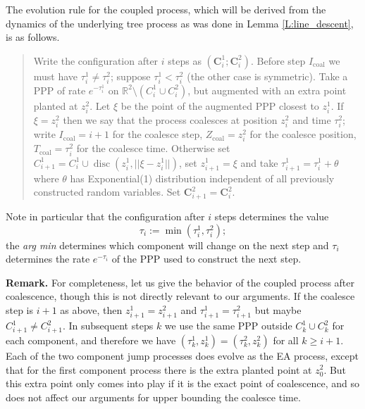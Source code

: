 \documentclass[12pt]{article}
\newcommand{\Reals}{{\mathbb{R}}}
\newcommand{\bC}{{\mathbf C}}
\newcommand{\Tcouple}{T_{\mathrm{coal}}}
\newcommand{\Icouple}{I_{\mathrm{coal}}}
\newcommand{\Zcouple}{Z_{\mathrm{coal}}}
\DeclareMathOperator{\disc}{disc}
\begin{document}
 
The evolution rule for the coupled process, which will be derived from
the dynamics of the underlying tree process as was done in Lemma \ref{L:line_descent},
is as follows.

\begin{quote}
 Write the configuration after $i$ steps as $(\bC^1_i; \bC^2_i)$. 
Before step $\Icouple$ we must have $\tau_i^1 \ne \tau^2_i$; 
 suppose $\tau_i^1 < \tau^2_i$ (the other case is symmetric).
Take a PPP of rate $e^{-\tau^1_i}$ on 
$\Reals^2 \setminus (C^1_i \cup C^2_i)$, but augmented with an extra point planted
at $z^2_i$.  
Let $\xi$ be the point of the augmented PPP closest to $z^1_i$.  
If $\xi = z^2_i$ then we say that the process coalesces at
position $z^2_i$ and time $\tau^2_i$; 
write $\Icouple = i+1$ for the coalesce step, 
$\Zcouple = z^2_i$ for the coalesce position,
$\Tcouple = \tau^2_i$ for the coalesce time.
Otherwise set $C^1_{i+1} = C^1_i \cup \disc(z^1_i, ||\xi - z^1_i||)$, 
set $z^1_{i+1} = \xi$ and take 
$\tau^1_{i+1} = \tau^1_i + \theta$
 where $\theta$ has Exponential(1) 
distribution independent of all previously constructed random variables.  
Set $ \bC^2_{i+1} =  \bC^2_i$.
\end{quote}

\noindent
Note in particular that the  configuration after $i$ steps determines the value
\begin{equation}
\tau_i := \min(\tau^1_i, \tau^2_i);
\end{equation}
 the {\em arg min} determines which component will change on the next step
and $\tau_i$ determines the rate $e^{- \tau_i}$  of the PPP used to construct the next step.


{\bf Remark.} 
For completeness, let us give the behavior of the coupled process after coalescence, though this is not directly relevant to our arguments. 
If the coalesce step is
 $i+1$ as above, then $z^1_{i+1} = z^2_{i+1}$ and 
$\tau^1_{i+1} = \tau^2_{i+1}$ but maybe $C^1_{i+1} \neq C^2_{i+1}$.  In  subsequent steps $k$ we use the same PPP outside 
$C^1_k \cup C^2_k$ for each component, and therefore we have 
$(\tau^1_k, z^1_k) = (\tau^2_k,z^2_k)$ for all $k \ge i+1$.
Each of the two component jump processes does evolve as the EA process, except that for the first component process there is the extra planted point at $z^2_0$.  But this extra point
 only comes into play if it is the exact point of coalescence, 
and so does not affect our arguments for upper bounding the 
coalesce time.
\end{document}

